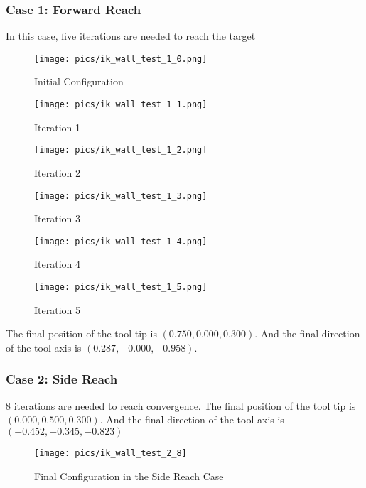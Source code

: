 \documentclass[english,10pt,a4paper]{book}
\begin{document}
		\subsubsection{Case 1: Forward Reach}
		In this case, five iterations are needed to reach the target
		\begin{figure}[H]
			\begin{minipage}{0.33\textwidth}
				\centering
				\texttt{[image: pics/ik\_wall\_test\_1\_0.png]}
				\caption{Initial Configuration}
			\end{minipage}
			\begin{minipage}{0.33\textwidth}
				\centering
				\texttt{[image: pics/ik\_wall\_test\_1\_1.png]}
				\caption{Iteration 1}
			\end{minipage}
			\begin{minipage}{0.33\textwidth}
				\centering
				\texttt{[image: pics/ik\_wall\_test\_1\_2.png]}
				\caption{Iteration 2}
			\end{minipage}
		\end{figure}
		\begin{figure}[H]
			\begin{minipage}{0.33\textwidth}
				\centering
				\texttt{[image: pics/ik\_wall\_test\_1\_3.png]}
				\caption{Iteration 3}
			\end{minipage}
			\begin{minipage}{0.33\textwidth}
				\centering
				\texttt{[image: pics/ik\_wall\_test\_1\_4.png]}
				\caption{Iteration 4}
			\end{minipage}
			\begin{minipage}{0.33\textwidth}
				\centering
				\texttt{[image: pics/ik\_wall\_test\_1\_5.png]}
				\caption{Iteration 5}
			\end{minipage}
		\end{figure}
		
		The final position of the tool tip is \((0.750, 0.000, 0.300)\). And the final direction of the tool axis is \((0.287, -0.000, -0.958)\).
		\subsubsection{Case 2: Side Reach}
		
		8 iterations are needed to reach convergence.
		The final position of the tool tip is \((0.000, 0.500, 0.300)\). And the final direction of the tool axis is \((-0.452, -0.345, -0.823)\)
		\begin{figure}[H]
			\centering
			\texttt{[image: pics/ik\_wall\_test\_2\_8]}
			\caption{Final Configuration in the Side Reach Case}
		\end{figure}
\end{document}
